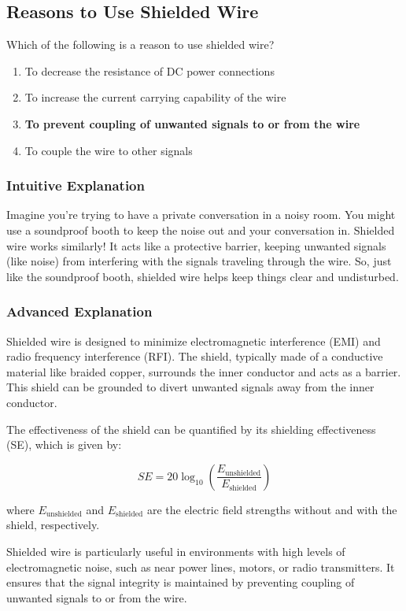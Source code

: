 \subsection{Reasons to Use Shielded Wire}
\label{T6D03}

\begin{tcolorbox}[colback=gray!10!white,colframe=black!75!black,title=T6D03]
Which of the following is a reason to use shielded wire?
\begin{enumerate}[label=\Alph*)]
    \item To decrease the resistance of DC power connections
    \item To increase the current carrying capability of the wire
    \item \textbf{To prevent coupling of unwanted signals to or from the wire}
    \item To couple the wire to other signals
\end{enumerate}
\end{tcolorbox}

\subsubsection{Intuitive Explanation}
Imagine you're trying to have a private conversation in a noisy room. You might use a soundproof booth to keep the noise out and your conversation in. Shielded wire works similarly! It acts like a protective barrier, keeping unwanted signals (like noise) from interfering with the signals traveling through the wire. So, just like the soundproof booth, shielded wire helps keep things clear and undisturbed.

\subsubsection{Advanced Explanation}
Shielded wire is designed to minimize electromagnetic interference (EMI) and radio frequency interference (RFI). The shield, typically made of a conductive material like braided copper, surrounds the inner conductor and acts as a barrier. This shield can be grounded to divert unwanted signals away from the inner conductor. 

The effectiveness of the shield can be quantified by its shielding effectiveness (SE), which is given by:

\[
SE = 20 \log_{10} \left( \frac{E_{\text{unshielded}}}{E_{\text{shielded}}} \right)
\]

where \( E_{\text{unshielded}} \) and \( E_{\text{shielded}} \) are the electric field strengths without and with the shield, respectively.

Shielded wire is particularly useful in environments with high levels of electromagnetic noise, such as near power lines, motors, or radio transmitters. It ensures that the signal integrity is maintained by preventing coupling of unwanted signals to or from the wire.

